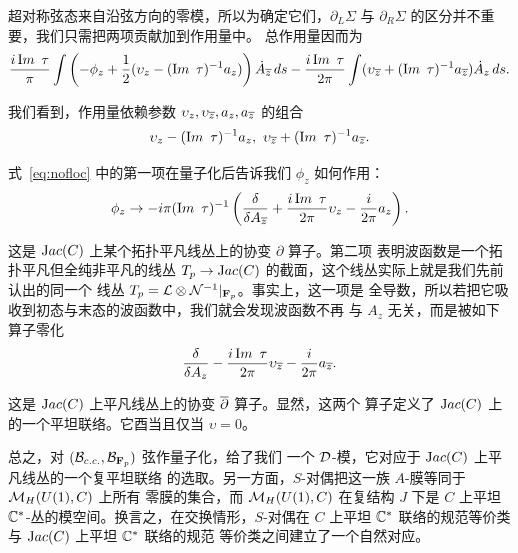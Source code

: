 超对称弦态来自沿弦方向的零模，所以为确定它们，$\partial_L\Sigma$ 与
$\partial_R\Sigma$ 的区分并不重要，我们只需把两项贡献加到作用量中。
总作用量因而为
\setcounter{equation}{21}
\begin{equation}\label{eq:nofloc}
{i\,\Im\,\tau\over \pi}\int \left(-\phi_z+{1\over
2}(\upsilon_z-(\Im\,\tau)^{-1}a_z)\right)\dot{A}_\bz \,ds-{i\,\Im\,\tau\over
2\pi}\int(\upsilon_\bz+(\Im\,\tau)^{-1}a_\bz) \dot{A}_z\,ds.
\end{equation}

我们看到，作用量依赖参数 $\upsilon_z,\upsilon_\bz,a_z,a_\bz$ 的组合
\setcounter{equation}{22}
\begin{equation}\label{eq:numiko}
\upsilon_z-(\Im\,\tau)^{-1}a_z,\ \upsilon_\bz+(\Im\,\tau)^{-1}a_\bz.
\end{equation}

式~\eqref{eq:nofloc} 中的第一项在量子化后告诉我们 $\phi_z$ 如何作用：
\setcounter{equation}{23}
\begin{equation}\label{eq:xococox}
\phi_z\to -i\pi(\Im\,\tau)^{-1}\left({\delta\over\delta
A_\bz}+{i\,\Im\,\tau\over 2\pi}\upsilon_z-{i\over 2\pi} a_z\right).
\end{equation}

这是 ${\rm Jac}(C)$ 上某个拓扑平凡线丛上的协变 $\partial$ 算子。第二项
表明波函数是一个拓扑平凡但全纯非平凡的线丛
$T_p\to{\rm Jac}(C)$ 的截面，这个线丛实际上就是我们先前认出的同一个
线丛 $T_p=\cL\otimes {\cal N}^{-1}\vert_{{\CMF}_p}$。事实上，这一项是
全导数，所以若把它吸收到初态与末态的波函数中，我们就会发现波函数不再
与 $A_z$ 无关，而是被如下算子零化
\setcounter{equation}{24}
\begin{equation}\label{eq:bilbox}
{\delta\over\delta A_z}-{i\,\Im\,\tau\over 2\pi}\upsilon_\bz-{i\over
2\pi} a_\bz .
\end{equation}

这是 ${\rm Jac}(C)$ 上平凡线丛上的协变 $\bpartial$ 算子。显然，这两个
算子定义了 ${\rm Jac}(C)$ 上的一个平坦联络。它酉当且仅当 $\upsilon=0$。

总之，对 $({\cal B}_{c.c.},{\cal B}_{{\CMF}_p})$ 弦作量子化，给了我们
一个 ${\cal D}$-模，它对应于 ${\rm Jac}(C)$ 上平凡线丛的一个复平坦联络
的选取。另一方面，$S$-对偶把这一族 $A$-膜等同于 $\MH(U(1),C)$ 上所有
零膜的集合，而 $\MH(U(1),C)$ 在复结构 $J$ 下是 $C$ 上平坦
$\Bbb{C}^*$-丛的模空间。换言之，在交换情形，$S$-对偶在 $C$ 上平坦
$\CC^*$ 联络的规范等价类与 ${\rm Jac}(C)$ 上平坦 $\CC^*$ 联络的规范
等价类之间建立了一个自然对应。

